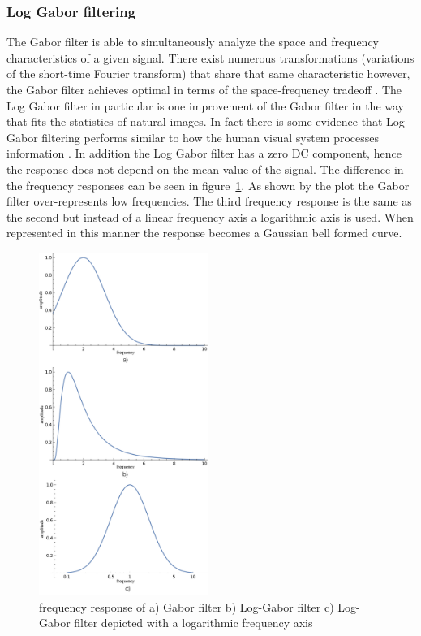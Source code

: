 \documentclass[journal]{IEEEtran}
\begin{document}
\subsubsection{Log Gabor filtering}
The Gabor filter is able to simultaneously analyze the space and frequency characteristics of a given signal. There exist numerous transformations (variations of the short-time Fourier transform) that share that same characteristic however, the Gabor filter achieves optimal in terms of the space-frequency tradeoff \cite{gabor1946theory}. The Log Gabor filter in particular is one improvement of the Gabor filter in the way that fits the statistics of natural images. In fact there is some evidence that Log Gabor filtering performs similar to how the human visual system processes information \cite{daugman1985uncertainty}. In addition the Log Gabor filter has a zero DC component, hence the response does not depend on the mean value of the signal. The difference in the frequency responses can be seen in figure~\ref{fig:frequency_response}. As shown by the plot the Gabor filter over-represents low frequencies. The third frequency response is the same as the second but instead of a linear frequency axis a logarithmic axis is used. When represented in this manner the response becomes a Gaussian bell formed curve.   
\begin{figure}[t]
	\centering
  \includegraphics[width=0.49\textwidth]{iris/freq_response_gabor.png}
	\caption{frequency response of  a) Gabor filter b) Log-Gabor filter c) Log-Gabor filter depicted with a logarithmic frequency axis}
	\label{fig:frequency_response}
\end{figure}
\end{document}
